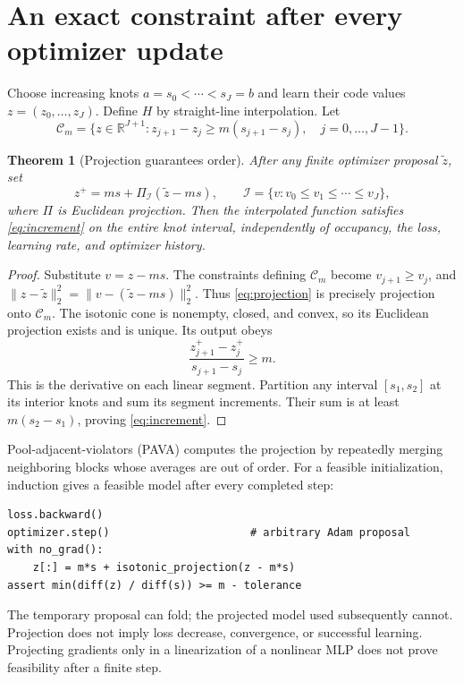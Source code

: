 \documentclass[11pt]{article}
\newtheorem{theorem}{Theorem}
\newcommand{\R}{\mathbb R}
\begin{document}
\newpage
\section{An exact constraint after every optimizer update}
Choose increasing knots $a=s_0<\cdots<s_J=b$ and learn their code values
$z=(z_0,\ldots,z_J)$. Define $H$ by straight-line interpolation. Let
\begin{equation}
\mathcal C_m=\{z\in\R^{J+1}:z_{j+1}-z_j\ge m(s_{j+1}-s_j),\quad j=0,\ldots,J-1\}.
\end{equation}
\begin{theorem}[Projection guarantees order]
After any finite optimizer proposal $\widetilde z$, set
\begin{equation}\label{eq:projection}
 z^+=m s+\Pi_{\mathcal I}(\widetilde z-ms),\qquad
 \mathcal I=\{v:v_0\le v_1\le\cdots\le v_J\},
\end{equation}
where $\Pi$ is Euclidean projection. Then the interpolated function satisfies
\eqref{eq:increment} on the entire knot interval, independently of occupancy,
the loss, learning rate, and optimizer history.
\end{theorem}
\begin{proof}
Substitute $v=z-ms$. The constraints defining $\mathcal C_m$ become
$v_{j+1}\ge v_j$, and
$\|z-\widetilde z\|_2^2=\|v-(\widetilde z-ms)\|_2^2$.
Thus \eqref{eq:projection} is precisely projection onto $\mathcal C_m$.
The isotonic cone is nonempty, closed, and convex, so its Euclidean
projection exists and is unique. Its output obeys
\[
 \frac{z^+_{j+1}-z^+_j}{s_{j+1}-s_j}\ge m.
\]
This is the derivative on each linear segment. Partition any interval
$[s_1,s_2]$ at its interior knots and sum its segment increments. Their sum
is at least $m(s_2-s_1)$, proving \eqref{eq:increment}.
\end{proof}
Pool-adjacent-violators (PAVA) computes the projection by repeatedly merging
neighboring blocks whose averages are out of order. For a feasible
initialization, induction gives a feasible model after every completed step:
\begin{verbatim}
loss.backward()
optimizer.step()                      # arbitrary Adam proposal
with no_grad():
    z[:] = m*s + isotonic_projection(z - m*s)
assert min(diff(z) / diff(s)) >= m - tolerance
\end{verbatim}
The temporary proposal can fold; the projected model used subsequently
cannot. Projection does not imply loss decrease, convergence, or successful
learning. Projecting gradients only in a linearization of a nonlinear MLP
does not prove feasibility after a finite step.
\end{document}
